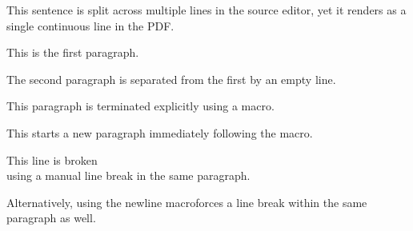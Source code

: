This sentence is split
across multiple lines in the source editor,
yet it renders as a single continuous line in the PDF.

This is the first paragraph.

The second paragraph is separated from the first by an empty line.

This paragraph is terminated explicitly using a macro.\par
This starts a new paragraph immediately following the macro.

This line is broken\\ using a manual line break in the same paragraph.

Alternatively, using the newline macro\newline forces a line break within the same paragraph as well.